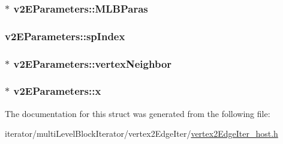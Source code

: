 \label{structv2EParameters_a95ab8c79b3944c72d11a99d0f025a321}
\hypertarget{structv2EParameters_ab06f8d41c20e729616a6cf3a2cfeae92}{
\subsubsection[{MLBParas}]{$\ast$ {\bf v2EParameters::MLBParas}}}
\label{structv2EParameters_ab06f8d41c20e729616a6cf3a2cfeae92}
\hypertarget{structv2EParameters_acbfa41217e7218a1089d4a585ba44b23}{
\subsubsection[{spIndex}]{ {\bf v2EParameters::spIndex}}}
\label{structv2EParameters_acbfa41217e7218a1089d4a585ba44b23}
\hypertarget{structv2EParameters_a74ce747488c691e6a1ff538a9cd6690b}{
\subsubsection[{vertexNeighbor}]{$\ast$ {\bf v2EParameters::vertexNeighbor}}}
\label{structv2EParameters_a74ce747488c691e6a1ff538a9cd6690b}
\hypertarget{structv2EParameters_a8730bf625a64be132bcd572f933be257}{
\subsubsection[{x}]{$\ast$ {\bf v2EParameters::x}}}
\label{structv2EParameters_a8730bf625a64be132bcd572f933be257}


The documentation for this struct was generated from the following file:\begin{DoxyCompactItemize}
\item 
iterator/multiLevelBlockIterator/vertex2EdgeIter/\hyperlink{vertex2EdgeIter__host_8h}{vertex2EdgeIter\_\-host.h}\end{DoxyCompactItemize}
